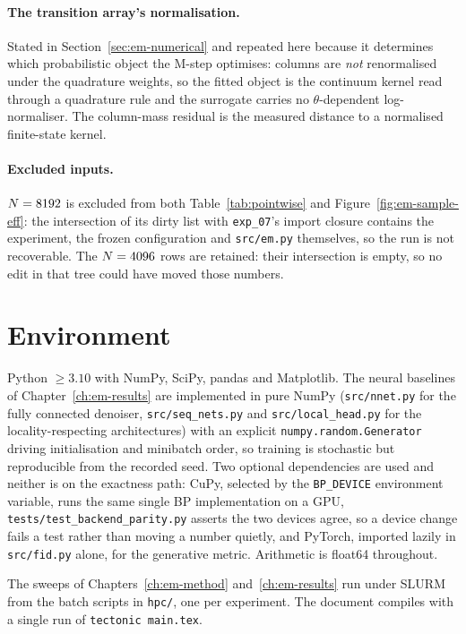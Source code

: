 \paragraph{The transition array's normalisation.} Stated in
Section~\ref{sec:em-numerical} and repeated here because it determines which
probabilistic object the M-step optimises: columns are \emph{not} renormalised
under the quadrature weights, so the fitted object is the continuum kernel read
through a quadrature rule and the surrogate carries no $\theta$-dependent
log-normaliser. The column-mass residual is the measured distance to a
normalised finite-state kernel.

\paragraph{Excluded inputs.} $N=8192$ is excluded from both
Table~\ref{tab:pointwise} and Figure~\ref{fig:em-sample-eff}: the
intersection of its dirty list with \texttt{exp\_07}'s import closure
contains the experiment, the frozen configuration and \texttt{src/em.py}
themselves, so the run is not recoverable. The $N=4096$ rows are
retained: their intersection is empty, so no edit in that tree could have
moved those numbers.

\section{Environment}

Python $\geq 3.10$ with NumPy, SciPy, pandas and Matplotlib. The neural
baselines of Chapter~\ref{ch:em-results} are implemented in pure NumPy
(\texttt{src/nnet.py} for the fully connected denoiser,
\texttt{src/seq\_nets.py} and \texttt{src/local\_head.py} for the
locality-respecting architectures) with an explicit
\texttt{numpy.random.Generator} driving initialisation and minibatch order,
so training is stochastic but reproducible from the recorded seed. Two
optional dependencies are used and neither is on the exactness path: CuPy,
selected by the \texttt{BP\_DEVICE} environment variable, runs the same
single BP implementation on a GPU, \texttt{tests/test\_backend\_parity.py}
asserts the two devices agree, so a device change fails a test rather than
moving a number quietly, and PyTorch, imported lazily in
\texttt{src/fid.py} alone, for the generative metric. Arithmetic is float64
throughout.

The sweeps of Chapters~\ref{ch:em-method} and~\ref{ch:em-results} run under
SLURM from the batch scripts in \texttt{hpc/}, one per experiment. The
document compiles with a single run of \texttt{tectonic main.tex}.

\setlength{\emergencystretch}{0pt}
